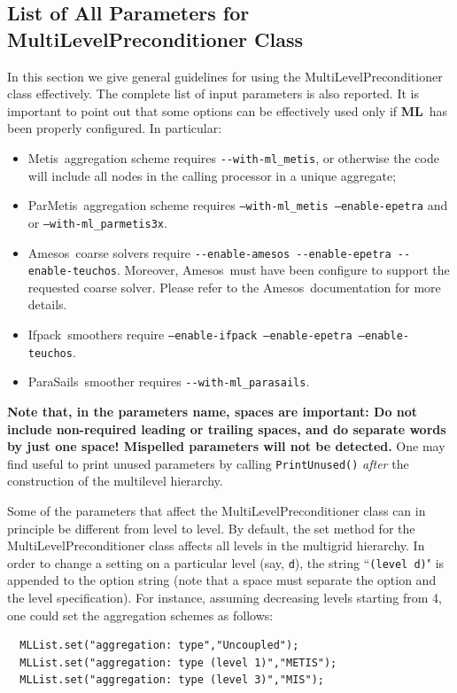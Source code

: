 \documentclass{article}[11pt]
\newcommand{\ML}     {{\bf ML}}
\newcommand{\amesos}  {{\sc Amesos}}
\newcommand{\metis}  {{\sc Metis}}
\newcommand{\parmetis}  {{\sc ParMetis}}
\newcommand{\ifpack}  {{\sc Ifpack}}
\newcommand{\parasails}  {{\sc ParaSails}}
\begin{document}
%
\subsection{List of All Parameters for MultiLevelPreconditioner Class}
\label{all possible parameters}
%
In this section we give general guidelines for using the
MultiLevelPreconditioner class effectively.
The complete list of input parameters is also reported.
%
It is important to point out that some options can be effectively used
only if \ML\ has been properly configured. In particular:
\begin{itemize}
\item \metis\ aggregation scheme requires \verb!--with-ml_metis!, or
  otherwise the code will include all nodes in the calling processor in
  a unique aggregate;
\item \parmetis~aggregation scheme requires {\tt --with-ml\_metis
  --enable-epetra} and  or
  {\tt --with-ml\_parmetis3x}. 
\item \amesos~coarse solvers require \verb!--enable-amesos --enable-epetra --enable-teuchos!. Moreover,
  \amesos~must have been configure to support the requested coarse
  solver. Please refer to the \amesos~documentation for more details.
\item \ifpack~smoothers require {\tt --enable-ifpack --enable-epetra
  --enable-teuchos}.
\item \parasails~smoother requires \verb!--with-ml_parasails!.
\end{itemize}

\medskip

\noindent
{\bf Note that, in the parameters name, spaces are important: Do not
  include non-required leading or trailing spaces, and do separate words by
  just one space! Mispelled parameters will not be detected.} One may
find useful to print unused parameters by calling \verb!PrintUnused()!
{\sl after} the construction
of the multilevel hierarchy.\\

\medskip

Some of the parameters that affect the MultiLevelPreconditioner class can in
principle be different from level to level.  By default, the set method
for the MultiLevelPreconditioner class affects all levels in the
multigrid hierarchy.  In order to change a setting on a particular level
(say, \verb!d!), the string ``\verb!(level d)!" is appended to the
option string (note that a space must separate the option and the level
specification).  For instance, assuming decreasing levels starting from
4, one could set the aggregation schemes as follows:
\begin{verbatim}
  MLList.set("aggregation: type","Uncoupled");
  MLList.set("aggregation: type (level 1)","METIS");
  MLList.set("aggregation: type (level 3)","MIS");
\end{verbatim}
\end{document}
